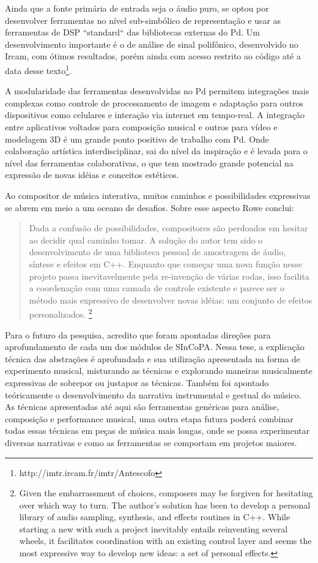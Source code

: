 \documentclass{ppgmus}
\begin{document}
Ainda que a fonte primária de entrada seja o áudio puro, se optou por
desenvolver ferramentas no nível sub-simbólico de representação e usar as ferramentas
de DSP ``standard`` das bibliotecas externas do Pd. Um desenvolvimento importante
é o de análise de sinal polifônico, desenvolvido no Ircam, com ótimos resultados,
porém ainda com acesso restrito
ao código até a data desse texto\footnote{http://imtr.ircam.fr/imtr/Antescofo}.    


A modularidade das ferramentas desenvolvidas no Pd permitem
integrações mais complexas como controle de  processamento de imagem
e adaptação para outros dispositivos como celulares e interação via internet
em tempo-real. A integração entre aplicativos voltados para composição musical
e outros para vídeo e modelagem 3D é um grande ponto positivo de trabalho com
Pd. Onde colaboração artística interdisciplinar, sai do nível da inspiração e é levada para 
o nível das ferramentas colaborativas, o que tem mostrado grande potencial na expressão
de novas idéias e conceitos estéticos.

Ao compositor de música interativa, muitos caminhos e possibilidades
expressivas se abrem em meio a um oceano de desafios. Sobre esse aspecto
Rowe conclui:

\begin{quote}
Dada a confusão de possibilidades, compositores
são perdoados em hesitar ao decidir qual caminho
tomar. A solução do autor tem sido o desenvolvimento
de uma biblioteca pessoal de amostragem de áudio, síntese e
efeitos em C++. Enquanto que começar uma nova função
nesse projeto passa inevitavelmente pela re-invenção
de várias rodas, isso facilita a coordenação com uma
camada de controle existente e parece ser o método 
mais expressivo de desenvolver novas idéias: um
conjunto de efeitos personalizados. \cite{rowe09:levels}
\footnote{Given the embarrassment of choices,
composers may be forgiven for hesitating over
which way to turn. The author's solution has
been to develop a personal library of audio
sampling, synthesis, and effects routines in C++.
While starting a new with such a project
inevitably entails reinventing several wheels, it
facilitates coordination with an existing control
layer and seems the most expressive
way to develop new ideas: a set of personal
effects.} 
\end{quote}


Para o futuro da pesquisa, acredito que foram apontadas direções para aprofundamento
de cada um dos módulos de SInCoPA. Nessa tese, a explicação técnica das abstrações é aprofundada e 
sua utilização apresentada na forma de experimento musical, misturando as técnicas e explorando 
maneiras musicalmente expressivas de
sobrepor ou justapor as técnicas. Também foi apontado teóricamente o 
desenvolvimento da narrativa instrumental e gestual do músico. 
As técnicas apresentadas até aqui são ferramentas genéricas para análise, composição
e performance musical, uma outra etapa futura poderá combinar todas essas técnicas em peças de música mais longas,
onde se possa experimentar diversas narrativas e como as ferramentas se comportam
em projetos maiores.
\end{document}
